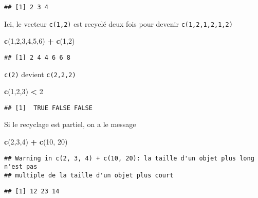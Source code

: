 \documentclass[]{book}
\newenvironment{Shaded}{\begin{snugshade}}{\end{snugshade}}
\newcommand{\DecValTok}[1]{\textcolor[rgb]{0.00,0.00,0.81}{#1}}
\newcommand{\KeywordTok}[1]{\textcolor[rgb]{0.13,0.29,0.53}{\textbf{#1}}}
\newcommand{\NormalTok}[1]{#1}
\newcommand{\OperatorTok}[1]{\textcolor[rgb]{0.81,0.36,0.00}{\textbf{#1}}}
\newcommand{\StringTok}[1]{\textcolor[rgb]{0.31,0.60,0.02}{#1}}
\begin{document}
\begin{verbatim}
## [1] 2 3 4
\end{verbatim}

Ici, le vecteur \texttt{c(1,2)} est recyclé deux fois pour devenir \texttt{c(1,2,1,2,1,2)}

\begin{Shaded}
\begin{Highlighting}[]
\KeywordTok{c}\NormalTok{(}\DecValTok{1}\NormalTok{,}\DecValTok{2}\NormalTok{,}\DecValTok{3}\NormalTok{,}\DecValTok{4}\NormalTok{,}\DecValTok{5}\NormalTok{,}\DecValTok{6}\NormalTok{) }\OperatorTok{+}\StringTok{ }\KeywordTok{c}\NormalTok{(}\DecValTok{1}\NormalTok{,}\DecValTok{2}\NormalTok{)}
\end{Highlighting}
\end{Shaded}

\begin{verbatim}
## [1] 2 4 4 6 6 8
\end{verbatim}

\texttt{c(2)} devient \texttt{c(2,2,2)}

\begin{Shaded}
\begin{Highlighting}[]
\KeywordTok{c}\NormalTok{(}\DecValTok{1}\NormalTok{,}\DecValTok{2}\NormalTok{,}\DecValTok{3}\NormalTok{) }\OperatorTok{<}\StringTok{ }\DecValTok{2}
\end{Highlighting}
\end{Shaded}

\begin{verbatim}
## [1]  TRUE FALSE FALSE
\end{verbatim}

Si le recyclage est partiel, on a le message

\begin{Shaded}
\begin{Highlighting}[]
\KeywordTok{c}\NormalTok{(}\DecValTok{2}\NormalTok{,}\DecValTok{3}\NormalTok{,}\DecValTok{4}\NormalTok{) }\OperatorTok{+}\StringTok{ }\KeywordTok{c}\NormalTok{(}\DecValTok{10}\NormalTok{, }\DecValTok{20}\NormalTok{)}
\end{Highlighting}
\end{Shaded}

\begin{verbatim}
## Warning in c(2, 3, 4) + c(10, 20): la taille d'un objet plus long n'est pas
## multiple de la taille d'un objet plus court
\end{verbatim}

\begin{verbatim}
## [1] 12 23 14
\end{verbatim}
\end{document}
